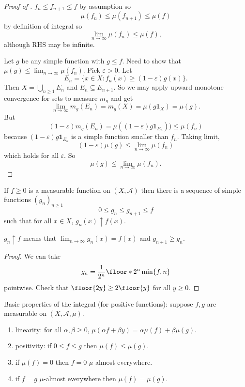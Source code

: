 \documentclass[a4paper]{article}
\begin{document}
\begin{proof}[Proof of ]
  \(f_n \leq f_{n + 1} \leq f\) by assumption so
  \[
    \mu(f_n) \leq \mu(f_{n + 1}) \leq \mu(f)
  \]
  by definition of integral so
  \[
    \lim_{n \to \infty} \mu(f_n) \leq \mu(f),
  \]
  although RHS may be infinite.

  Let \(g\) be any simple function with \(g \leq f\). Need to show that \(\mu(g) \leq \lim_{n \to \infty} \mu(f_n)\). Pick \(\varepsilon > 0\). Let
  \[
    E_n = \{x \in X: f_n(x) \geq (1 - \varepsilon) g(x) \}.
  \]
  Then \(X = \bigcup_{n \geq 1} E_n\) and \(E_n \subseteq E_{n + 1}\). So we may apply upward monotone convergence for sets to measure \(m_g\) and get
  \[
    \lim_{n \to \infty} m_g(E_n) = m_g(X) = \mu(g \mathbf 1_X) = \mu(g).
  \]
  But
  \[
    (1 - \varepsilon) m_g(E_n) = \mu((1 - \varepsilon) g \mathbf 1_{E_n})) \leq \mu(f_n)
  \]
  because \((1 - \varepsilon) g \mathbf 1_{E_n}\) is a simple function smaller than \(f_n\). Taking limit,
  \[
    (1 - \varepsilon) \mu(g) \leq \lim_{n \to \infty} \mu(f_n)
  \]
  which holds for all \(\varepsilon\). So
  \[
    \mu(g) \leq \lim_{n \to \infty} \mu(f_n).
  \]
\end{proof}

\begin{lemma}
  \label{lem:approximation by simple functions}
  If \(f \geq 0\) is a measurable function on \((X, \mathcal A)\) then there is a sequence of simple functions \((g_n)_{n \geq 1}\)
  \[
    0 \leq g_n \leq g_{n + 1} \leq f
  \]
  such that for all \(x \in X\), \(g_n(x) \uparrow f(x)\).
\end{lemma}

\begin{notation}
  \(g_n \uparrow f\) means that \(\lim_{n \to \infty} g_n(x) = f(x)\) and \(g_{n + 1} \geq g_n\).
\end{notation}

\begin{proof}
  We can take
  \[
    g_n = \frac{1}{2^n} \floor*{2^n \min \{f, n\}}
  \]
  pointwise. Check that \(\floor{2y} \geq 2 \floor{y}\) for all \(y \geq 0\).
\end{proof}

\begin{proposition}
  Basic properties of the integral (for positive functions): suppose \(f, g\) are measurable on \((X, \mathcal A, \mu)\).
  \begin{enumerate}
  \item linearity: for all \(\alpha, \beta \geq 0\), \(\mu(\alpha f + \beta y) = \alpha \mu(f) + \beta \mu(g)\).
  \item positivity: if \(0 \leq f \leq g\) then \(\mu(f) \leq \mu(g)\).
  \item if \(\mu(f) = 0\) then \(f = 0\) \(\mu\)-almost everywhere.
  \item if \(f = g\) \(\mu\)-almost everywhere then \(\mu(f) = \mu(g)\).
  \end{enumerate}
\end{proposition}
\end{document}
